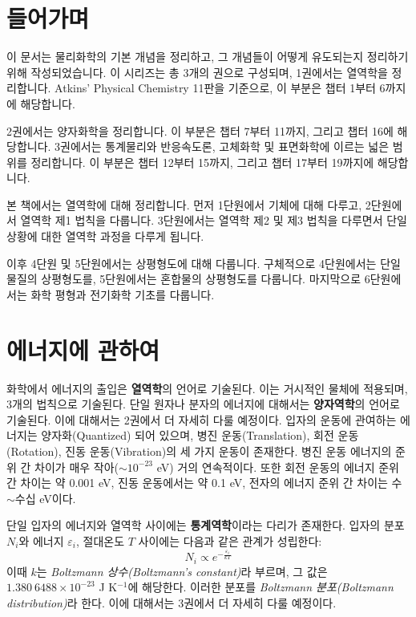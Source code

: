 \documentclass[10pt]{book}
\begin{document}
    \section{들어가며}
        \hspace{\parindent} 이 문서는 물리화학의 기본 개념을 정리하고, 그 개념들이 어떻게 유도되는지 정리하기 위해 작성되었습니다.
        이 시리즈는 총 3개의 권으로 구성되며, 1권에서는 열역학을 정리합니다. Atkins' Physical Chemistry 11판을 기준으로,
        이 부분은 챕터 1부터 6까지에 해당합니다.
        \par 2권에서는 양자화학을 정리합니다. 이 부분은 챕터 7부터 11까지, 그리고 챕터 16에 해당합니다. 3권에서는 통계물리와 반응속도론,
        고체화학 및 표면화학에 이르는 넓은 범위를 정리합니다. 이 부분은 챕터 12부터 15까지, 그리고 챕터 17부터 19까지에 해당합니다.
        \par 본 책에서는 열역학에 대해 정리합니다. 먼저 1단원에서 기체에 대해 다루고, 2단원에서 열역학 제1 법칙을 다룹니다. 
        3단원에서는 열역학 제2 및 제3 법칙을 다루면서 단일 상황에 대한 열역학 과정을 다루게 됩니다.
        \par 이후 4단원 및 5단원에서는 상평형도에 대해 
        다룹니다. 구체적으로 4단원에서는 단일 물질의 상평형도를, 5단원에서는 혼합물의 상평형도를 다룹니다. 마지막으로 6단원에서는 화학 평형과 
        전기화학 기초를 다룹니다.
    \section{에너지에 관하여}
        \hspace{\parindent} 화학에서 에너지의 출입은 \textbf{열역학}의 언어로 기술된다. 이는 거시적인 물체에 적용되며, 3개의 법칙으로 기술된다. 
        단일 원자나 분자의 에너지에 대해서는 \textbf{양자역학}의 언어로 기술된다. 이에 대해서는 2권에서 더 자세히 다룰 예정이다. 
        입자의 운동에 관여하는 에너지는 양자화(Quantized) 되어 있으며, 병진 운동(Translation), 회전 운동(Rotation), 진동 운동(Vibration)의 
        세 가지 운동이 존재한다. 병진 운동 에너지의 준위 간 차이가 매우 작아($\sim 10^{-23}$ eV) 거의 연속적이다. 또한 
        회전 운동의 에너지 준위 간 차이는 약 0.001 eV, 진동 운동에서는 약 0.1 eV, 전자의 에너지 준위 간 차이는 수$\sim$수십 eV이다.
        \par 단일 입자의 에너지와 열역학 사이에는 \textbf{통계역학}이라는 다리가 존재한다. 입자의 분포 $N_i$와 에너지 $\varepsilon_{i}$, 
        절대온도 $T$ 사이에는 다음과 같은 관계가 성립한다:
        \begin{equation*}
            N_i \propto e^{- \frac{\varepsilon_{i}}{kT}}
        \end{equation*}
        이때 $k$는 \textit{Boltzmann 상수(Boltzmann's constant)}라 부르며, 그 값은 $1.380 \ 6488 \times 10^{-23}$ \textrm{J K$^{-1}$}에 해당한다. 이러한 
        분포를 \textit{Boltzmann 분포(Boltzmann distribution)}라 한다. 이에 대해서는 3권에서 더 자세히 다룰 예정이다.
\renewcommand{\contentsname}{차례}
\tableofcontents
\end{document}
